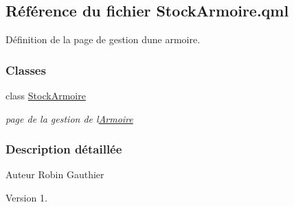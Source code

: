 \hypertarget{_stock_armoire_8qml}{}\subsection{Référence du fichier Stock\+Armoire.\+qml}
\label{_stock_armoire_8qml}


Définition de la page de gestion d\textquotesingle{}une armoire.  


\subsubsection*{Classes}
\begin{DoxyCompactItemize}
\item 
class \hyperlink{class_stock_armoire}{Stock\+Armoire}
\begin{DoxyCompactList}\small\item\em page de la gestion de l\textquotesingle{}\hyperlink{class_armoire}{Armoire} \end{DoxyCompactList}\end{DoxyCompactItemize}


\subsubsection{Description détaillée}
\begin{DoxyAuthor}{Auteur}
Robin Gauthier
\end{DoxyAuthor}
\begin{DoxyVersion}{Version}
1. 
\end{DoxyVersion}
